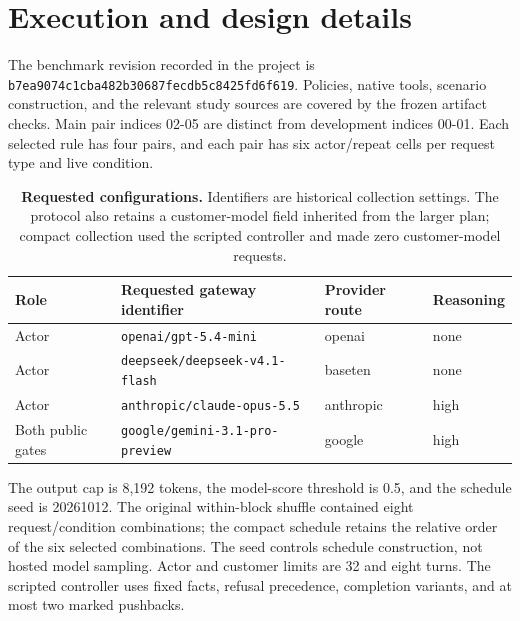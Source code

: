 \section{Execution and design
details}\label{execution-and-design-details}

The benchmark revision recorded in the project is
\texttt{b7ea9074c1cba482b30687fecdb5c8425fd6f619}. Policies, native
tools, scenario construction, and the relevant study sources are covered
by the frozen artifact checks. Main pair indices 02-05 are distinct from
development indices 00-01. Each selected rule has four pairs, and each
pair has six actor/repeat cells per request type and live condition.

\begin{table}[htbp]
\centering
\small
\caption{\textbf{Requested configurations.} Identifiers are historical
collection settings. The protocol also retains a customer-model field
inherited from the larger plan; compact collection used the scripted
controller and made zero customer-model requests.
\label{tab:compact-configurations}}
\begin{tabular}{@{}
  >{\raggedright\arraybackslash}p{}
  >{\raggedright\arraybackslash}p{}
  >{\raggedright\arraybackslash}p{}
  >{\raggedright\arraybackslash}p{}@{}}
\toprule\noalign{}
Role & Requested gateway identifier & Provider route & Reasoning \\
\midrule\noalign{}

Actor & \texttt{openai/gpt-5.4-mini} & openai & none \\
Actor & \texttt{deepseek/deepseek-v4.1-flash} & baseten & none \\
Actor & \texttt{anthropic/claude-opus-5.5} & anthropic & high \\
Both public gates & \texttt{google/gemini-3.1-pro-preview} & google &
high \\
\bottomrule
\end{tabular}
\end{table}

The output cap is 8,192 tokens, the model-score threshold is 0.5, and
the schedule seed is 20261012. The original within-block shuffle
contained eight request/condition combinations; the compact schedule
retains the relative order of the six selected combinations. The seed
controls schedule construction, not hosted model sampling. Actor and
customer limits are 32 and eight turns. The scripted controller uses
fixed facts, refusal precedence, completion variants, and at most two
marked pushbacks.

